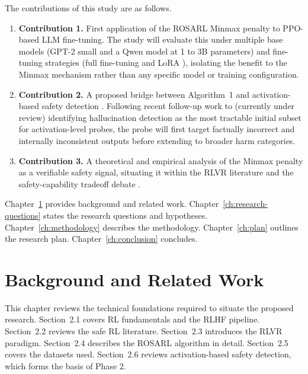 \documentclass[a4paper,twoside,12pt]{report}
\begin{document}
The contributions of this study are as follows.

\begin{enumerate}
  \item \textbf{Contribution 1.} First application of the ROSARL Minmax penalty to
    PPO-based LLM fine-tuning. The study will evaluate this under multiple base models
    (GPT-2 small and a Qwen model at 1 to 3B parameters) and fine-tuning strategies (full
    fine-tuning and LoRA \citep{hu2022lora}), isolating the benefit to the Minmax mechanism
    rather than any specific model or training configuration.
  \item \textbf{Contribution 2.} A proposed bridge between Algorithm~1 and activation-based
    safety detection \citep{han2025safeswitch, rateike2023}. Following recent follow-up work
    to \citet{rateike2023} (currently under review) identifying hallucination detection as
    the most tractable initial subset for activation-level probes, the probe will first
    target factually incorrect and internally inconsistent outputs before extending to
    broader harm categories.
  \item \textbf{Contribution 3.} A theoretical and empirical analysis of the Minmax penalty
    as a verifiable safety signal, situating it within the RLVR literature
    \citep{lambert2024rlvr, youssef2025grpo} and the safety-capability tradeoff debate
    \citep{safetyrlvr2025}.
\end{enumerate}

Chapter~\ref{ch:background} provides background and related work.
Chapter~\ref{ch:research-questions} states the research questions and hypotheses.
Chapter~\ref{ch:methodology} describes the methodology.
Chapter~\ref{ch:plan} outlines the research plan. Chapter~\ref{ch:conclusion} concludes.

\chapter{Background and Related Work}
\label{ch:background}

This chapter reviews the technical foundations required to situate the proposed research.
Section~2.1 covers RL fundamentals and the RLHF pipeline. Section~2.2 reviews the safe RL
literature. Section~2.3 introduces the RLVR paradigm. Section~2.4 describes the ROSARL
algorithm in detail. Section~2.5 covers the datasets used. Section~2.6 reviews
activation-based safety detection, which forms the basis of Phase 2.
\end{document}
